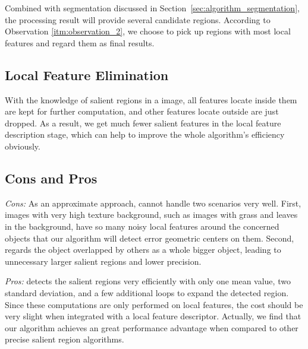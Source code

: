 Combined with segmentation discussed in Section~\ref{sec:algorithm_segmentation}, the processing result will provide several candidate regions. According to Observation \ref{itm:observation_2}, we choose to pick up regions with most local features and regard them as final results.

\subsection{Local Feature Elimination}
\label{sec:algorithm_elimation}

With the knowledge of salient regions in a image, all features locate inside them are kept for further computation, and other features locate outside are just dropped. As a result, we get much fewer salient features in the local feature description stage, which can help to improve the whole algorithm's efficiency obviously.

\subsection{Cons and Pros}
\label{sec:algorithm_summary}

\textit{Cons:} As an approximate approach, {\sys} cannot handle two scenarios very well. First, images with very high texture background, such as images with grass and leaves in the background, have so many noisy local features around the concerned objects that our algorithm will detect error geometric centers on them. Second, {\sys} regards the object overlapped by others as a whole bigger object, leading to unnecessary larger salient regions and lower precision.

\textit{Pros:} {\sys} detects the salient regions very efficiently with only one mean value, two standard deviation, and a few additional loops to expand the detected region. Since these computations are only performed on local features, the cost should be very slight when integrated with a local feature descriptor. Actually, we find that our algorithm achieves an great performance advantage when compared to other precise salient region algorithms. 

